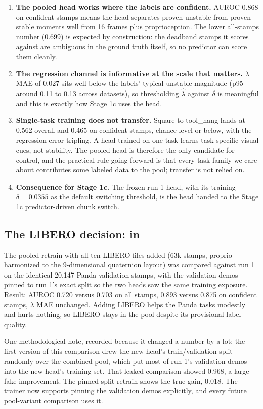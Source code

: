 \documentclass[11pt]{article}
\begin{document}
\begin{enumerate}[leftmargin=1.6em]
\item \textbf{The pooled head works where the labels are confident.} AUROC 0.868 on
confident stamps means the head separates proven-unstable from proven-stable
moments well from 16 frames plus proprioception. The lower all-stamps number
(0.699) is expected by construction: the deadband stamps it scores against are
ambiguous in the ground truth itself, so no predictor can score them cleanly.
\item \textbf{The regression channel is informative at the scale that matters.}
$\lambda$ MAE of 0.027 sits well below the labels' typical unstable magnitude
(p95 around 0.11 to 0.13 across datasets), so thresholding $\hat\lambda$ against
$\delta$ is meaningful and this is exactly how Stage 1c uses the head.
\item \textbf{Single-task training does not transfer.} Square to tool\_hang lands
at 0.562 overall and 0.465 on confident stamps, chance level or below, with the
regression error tripling. A head trained on one task learns task-specific visual
cues, not stability. The pooled head is therefore the only candidate for control,
and the practical rule going forward is that every task family we care about
contributes some labeled data to the pool; transfer is not relied on.
\item \textbf{Consequence for Stage 1c.} The frozen run-1 head, with its training
$\delta = 0.0355$ as the default switching threshold, is the head handed to the
Stage 1c predictor-driven chunk switch.
\end{enumerate}

\subsection{The LIBERO decision: in}

The pooled retrain with all ten LIBERO files added (63k stamps, proprio
harmonized to the 9-dimensional quaternion layout) was compared against run 1 on
the identical 20{,}147 Panda validation stamps, with the validation demos pinned
to run 1's exact split so the two heads saw the same training exposure. Result:
AUROC 0.720 versus 0.703 on all stamps, 0.893 versus 0.875 on confident stamps,
$\lambda$ MAE unchanged. Adding LIBERO helps the Panda tasks modestly and hurts
nothing, so LIBERO stays in the pool despite its provisional label quality.

One methodological note, recorded because it changed a number by a lot: the first
version of this comparison drew the new head's train/validation split randomly
over the combined pool, which put most of run 1's validation demos into the new
head's training set. That leaked comparison showed 0.968, a large fake
improvement. The pinned-split retrain shows the true gain, 0.018. The trainer now
supports pinning the validation demos explicitly, and every future pool-variant
comparison uses it.
\end{document}
